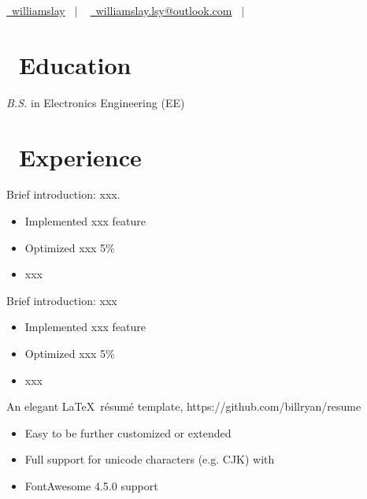 \documentclass{resume}
\begin{document}


\basicInfo
{
\href{https://github.com/williamslay}{\raisebox{-0.05\height}\faGithub\ williamslay} \ $|$ \
\href{mailto:williamslay.lsy@outlook.com}{\raisebox{-0.05\height}\faEnvelope \ williamslay.lsy@outlook.com} \ $|$ \
\href{tel:18851986021}{\raisebox{-0.05\height}} \\
}

\section{\faGraduationCap\ Education}
\textit{B.S.} in Electronics Engineering (EE)

\section{\faUsers\ Experience}
Brief introduction: xxx.
\begin{itemize}
  \item Implemented xxx feature
  \item Optimized xxx 5\%
  \item xxx
\end{itemize}

Brief introduction: xxx
\begin{itemize}
  \item Implemented xxx feature
  \item Optimized xxx 5\%
  \item xxx
\end{itemize}

An elegant \LaTeX\ résumé template, https://github.com/billryan/resume
\begin{itemize}
  \item Easy to be further customized or extended
  \item Full support for unicode characters (e.g. CJK) with \XeLaTeX\
  \item FontAwesome 4.5.0 support
\end{itemize}
\end{document}
